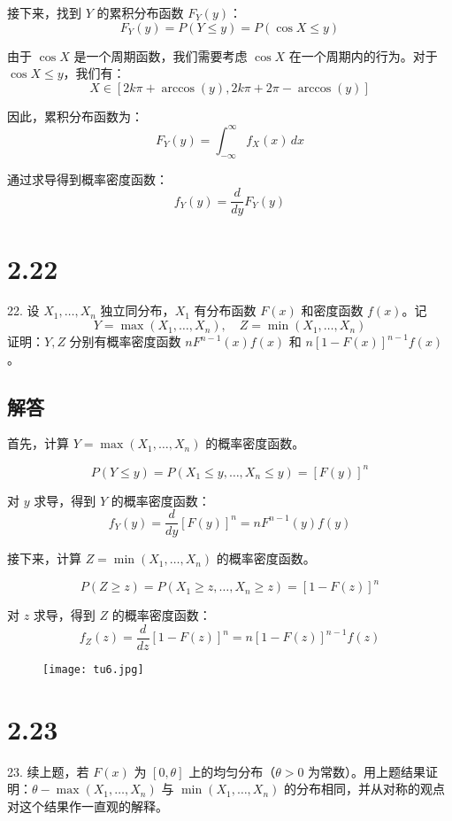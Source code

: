 \documentclass[UTF8]{report}
\theoremstyle{MyLineTheoremStyle} %
\theoremstyle{MyBlockTheoremStyle} %
\theoremstyle{MySubsubsectionStyle} %
\begin{document}
接下来，找到 \(Y\) 的累积分布函数 \(F_Y(y)\)：
\[
F_Y(y) = P(Y \leq y) = P(\cos X \leq y)
\]

由于 \(\cos X\) 是一个周期函数，我们需要考虑 \(\cos X\) 在一个周期内的行为。对于 \(\cos X \leq y\)，我们有：
\[
X \in [2k\pi + \arccos(y), 2k\pi + 2\pi - \arccos(y)]
\]

因此，累积分布函数为：
\[
F_Y(y) = \int_{-\infty}^{\infty} f_X(x) \, dx
\]

通过求导得到概率密度函数：
\[
f_Y(y) = \frac{d}{dy} F_Y(y)
\]

\section{2.22}

22. 设 \(X_1, \ldots, X_n\) 独立同分布，\(X_1\) 有分布函数 \(F(x)\) 和密度函数 \(f(x)\)。记
\[
Y = \max(X_1, \ldots, X_n), \quad Z = \min(X_1, \ldots, X_n)
\]
证明：\(Y, Z\) 分别有概率密度函数 \(nF^{n-1}(x)f(x)\) 和 \(n[1-F(x)]^{n-1} f(x)\)。

\subsection*{解答}

首先，计算 \(Y = \max(X_1, \ldots, X_n)\) 的概率密度函数。

\[
P(Y \leq y) = P(X_1 \leq y, \ldots, X_n \leq y) = [F(y)]^n
\]

对 \(y\) 求导，得到 \(Y\) 的概率密度函数：
\[
f_Y(y) = \frac{d}{dy} [F(y)]^n = nF^{n-1}(y) f(y)
\]

接下来，计算 \(Z = \min(X_1, \ldots, X_n)\) 的概率密度函数。

\[
P(Z \geq z) = P(X_1 \geq z, \ldots, X_n \geq z) = [1 - F(z)]^n
\]

对 \(z\) 求导，得到 \(Z\) 的概率密度函数：
\[
f_Z(z) = \frac{d}{dz} [1 - F(z)]^n = n[1 - F(z)]^{n-1} f(z)
\]

\begin{figure}[H]
    \centering
    \texttt{[image: tu6.jpg]}
\end{figure}




\section{2.23}

23. 续上题，若 \(F(x)\) 为 \([0, \theta]\) 上的均匀分布（\(\theta > 0\) 为常数）。用上题结果证明：\(\theta - \max(X_1, \ldots, X_n)\) 与 \(\min(X_1, \ldots, X_n)\) 的分布相同，并从对称的观点对这个结果作一直观的解释。
\end{document}
